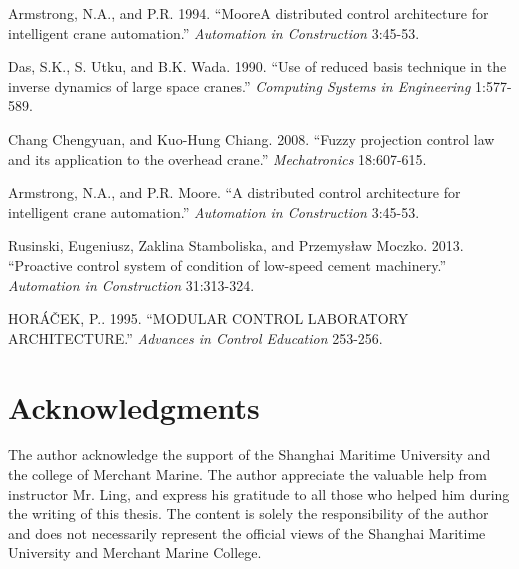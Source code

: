 \documentclass[a4paper,10.5pt]{article}
\begin{document}
\setlength{\hangindent}{4em}
Armstrong, N.A., and P.R. 1994. “MooreA distributed control architecture for intelligent crane automation.” 
\textit{Automation in Construction} 3:45-53. \par

\setlength{\hangindent}{4em}
Das, S.K., S. Utku, and B.K. Wada. 1990. “Use of reduced basis technique in the inverse dynamics of large space cranes.”
\textit{Computing Systems in Engineering} 1:577-589. \par

\setlength{\hangindent}{4em}
Chang Chengyuan, and Kuo-Hung Chiang. 2008. “Fuzzy projection control law and its application to the overhead crane.”
\textit{Mechatronics} 18:607-615. \par

\setlength{\hangindent}{4em}
Armstrong, N.A., and P.R. Moore. “A distributed control architecture for intelligent crane automation.”
\textit{Automation in Construction} 3:45-53. \par

\setlength{\hangindent}{4em}
Rusinski, Eugeniusz, Zaklina Stamboliska, and Przemysław Moczko. 2013. “Proactive control system of condition of low-speed cement machinery.”
\textit{Automation in Construction} 31:313-324. \par

\setlength{\hangindent}{4em}
HORÁČEK, P.. 1995. “MODULAR CONTROL LABORATORY ARCHITECTURE.”
\textit{Advances in Control Education} 253-256.

\section*{Acknowledgments}
The author acknowledge the support of the Shanghai Maritime
University and the college of Merchant Marine. The author appreciate the valuable
help from instructor Mr. Ling, and express his gratitude to all those who helped him
during the writing of this thesis. The content is solely the responsibility of the author and
does not necessarily represent the official views of the Shanghai Maritime University
and Merchant Marine College.
\end{document}
